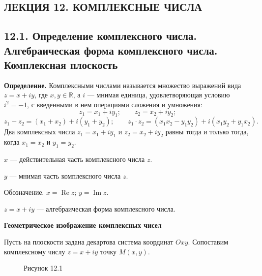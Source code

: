 \documentclass[12pt,a4paper]{article}
\begin{document}
\setcounter{page}{84}

\subsection*{\textbf{ЛЕКЦИЯ 12. КОМПЛЕКСНЫЕ ЧИСЛА}}

\subsection*{\textbf{12.1. Определение комплексного числа.
Алгебраическая форма комплексного числа. Комплексная плоскость}}

\textbf{Определение.} Комплексными числами называется множество выражений вида
$z=x+iy$, где $x,y\in\mathbb R$, а $i$ --- мнимая единица,
удовлетворяющая условию $i^2=-1$, с введенными в нем операциями
сложения и умножения:
$$
z_1=x_1+iy_1;\qquad z_2=x_2+iy_2;
$$
$$
z_1+z_2=(x_1+x_2)+i(y_1+y_2);\qquad
z_1\cdot z_2=(x_1x_2-y_1y_2)+i(x_1y_2+y_1x_2).
$$
Два комплексных числа $z_1=x_1+iy_1$ и $z_2=x_2+iy_2$ равны тогда и
только тогда, когда $x_1=x_2$ и $y_1=y_2$.

$x$ --- действительная часть комплексного числа $z$.

$y$ --- мнимая часть комплексного числа $z$.

Обозначение. $x=\operatorname{Re}z$; $y=\operatorname{Im}z$.

$z=x+iy$ --- алгебраическая форма комплексного числа.

\textbf{Геометрическое изображение комплексных чисел}

Пусть на плоскости задана декартова система координат $Oxy$.
Сопоставим комплексному числу $z=x+iy$ точку $M(x,y)$.

\begin{figure}[H]
  \centering
  \caption*{Рисунок 12.1}
\end{figure}
\end{document}
